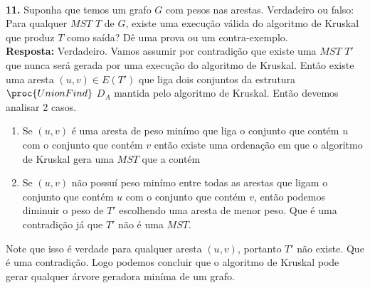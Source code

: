 \\[6pt]
\textbf{11. } Suponha que temos um grafo $G$ com pesos nas arestas. Verdadeiro ou falso: Para qualquer $MST$ $T$ de $G$, existe uma execução válida do algoritmo de Kruskal que produz $T$ como saída? Dê uma prova ou um contra-exemplo.
\\[6pt]
\noindent \textbf{Resposta: }Verdadeiro. Vamos assumir por contradição que existe uma $MST$ $T'$ que nunca será gerada por uma execução do algoritmo de Kruskal. Então existe uma aresta $(u,v) \in E(T')$ que liga dois conjuntos da estrutura $\proc{UnionFind}$ $D_A$ mantida pelo algoritmo de Kruskal. Então devemos analisar 2 casos.
\begin{enumerate}
 \item Se $(u,v)$ é uma aresta de peso minímo que liga o conjunto que contém $u$ com o conjunto que contém $v$ então existe uma ordenação em que o algoritmo de Kruskal gera uma $MST$ que a contém 
 \item Se $(u,v)$ não possuí peso minímo entre todas as arestas que ligam o conjunto que contém $u$ com o conjunto que contém $v$, então podemos diminuir o peso de $T'$ escolhendo uma aresta de menor peso. Que é uma contradição já que $T'$ não é uma $MST$.
\end{enumerate}

\noindent Note que isso é verdade para qualquer aresta $(u,v)$, portanto $T'$ não existe. Que é uma contradição. Logo podemos concluir que o algoritmo de Kruskal pode gerar qualquer árvore geradora miníma de um grafo. 